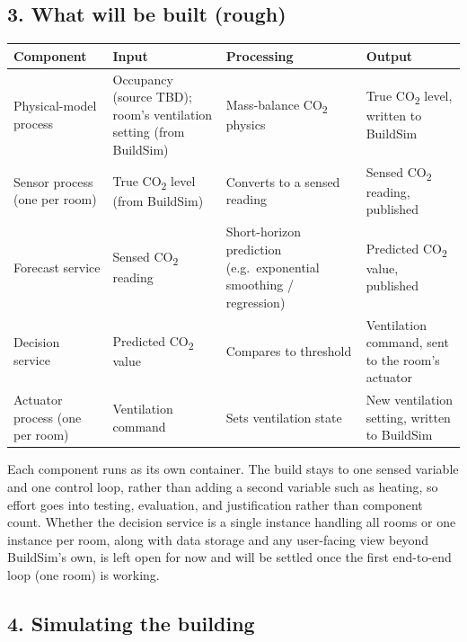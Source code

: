 \documentclass[
  11pt,
]{article}
\begin{document}
\subsection{3. What will be built (rough)}\label{what-will-be-built-rough}

\begin{longtable}[]{@{}
  >{\raggedright\arraybackslash}p{}
  >{\raggedright\arraybackslash}p{}
  >{\raggedright\arraybackslash}p{}
  >{\raggedright\arraybackslash}p{}@{}}
\toprule
\textbf{Component} & \textbf{Input} & \textbf{Processing} & \textbf{Output} \\
\midrule
\endhead
Physical-model process & Occupancy (source TBD); room's ventilation setting 
  (from BuildSim) &
  Mass-balance CO\textsubscript{2} physics &
  True CO\textsubscript{2} level, written to BuildSim \\
\addlinespace
Sensor process (one per room) & True CO\textsubscript{2} level (from BuildSim) &
  Converts to a sensed reading &
  Sensed CO\textsubscript{2} reading, published \\
\addlinespace
Forecast service & Sensed CO\textsubscript{2} reading &
  Short-horizon prediction (e.g.\ exponential smoothing / regression) &
  Predicted CO\textsubscript{2} value, published \\
\addlinespace
Decision service & Predicted CO\textsubscript{2} value &
  Compares to threshold &
  Ventilation command, sent to the room's actuator \\
\addlinespace
Actuator process (one per room) & Ventilation command &
  Sets ventilation state &
  New ventilation setting, written to BuildSim \\
\bottomrule
\end{longtable}

Each component
runs as its own container. The build stays to one sensed variable and one control
loop, rather than adding a second variable such as heating, so effort
goes into testing, evaluation, and justification rather than component
count. Whether the decision service is a single instance handling all
rooms or one instance per room, along with data storage and any
user-facing view beyond BuildSim's own, is left open for now and will be
settled once the first end-to-end loop (one room) is working.

\subsection{4. Simulating the building}\label{simulating-the-building}
\end{document}
